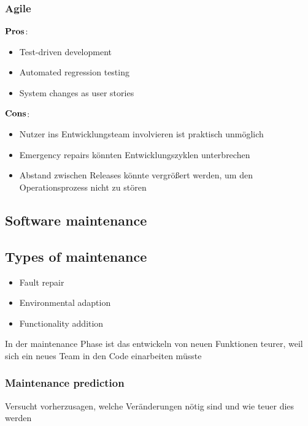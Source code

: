 \subsubsection{Agile}
\begin{multicols}{2}
$\bold{Pros}$:
\begin{itemize}
	\item Test-driven development
	\item Automated regression testing
	\item System changes as user stories
\end{itemize}
\columnbreak
$\bold{Cons}$:
\begin{itemize}
	\item Nutzer ins Entwicklungsteam involvieren ist praktisch unmöglich
	\item Emergency repairs könnten Entwicklungszyklen unterbrechen
	\item Abstand zwischen Releases könnte vergrößert werden, um den Operationsprozess nicht zu stören 
\end{itemize}
\end{multicols}
\subsection{Software maintenance}
\subsection{Types of maintenance}
\begin{itemize}
	\item Fault repair
	\item Environmental adaption
	\item Functionality addition
\end{itemize}
In der maintenance Phase ist das entwickeln von neuen Funktionen teurer, weil sich ein neues Team in den Code einarbeiten müsste
\subsubsection{Maintenance prediction}
Versucht vorherzusagen, welche Veränderungen nötig sind und wie teuer dies werden
